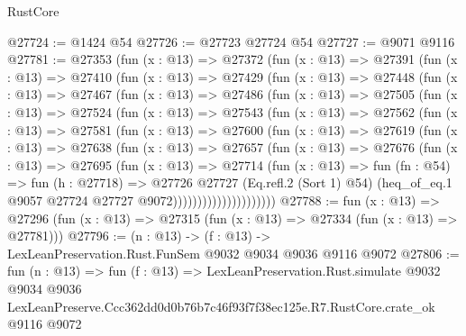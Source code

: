 \begin{lexlean}{RustCore}
\begin{coremodule}
@27724 := @1424 @54
@27726 := @27723 @27724 @54
@27727 := @9071 @9116
@27781 := @27353
    (fun (x : @13) =>
    @27372
      (fun (x : @13) =>
      @27391
        (fun (x : @13) =>
        @27410
          (fun (x : @13) =>
          @27429
            (fun (x : @13) =>
            @27448
              (fun (x : @13) =>
              @27467
                (fun (x : @13) =>
                @27486
                  (fun (x : @13) =>
                  @27505
                    (fun (x : @13) =>
                    @27524
                      (fun (x : @13) =>
                      @27543
                        (fun (x : @13) =>
                        @27562
                          (fun (x : @13) =>
                          @27581
                            (fun (x : @13) =>
                            @27600
                              (fun (x : @13) =>
                              @27619
                                (fun (x : @13) =>
                                @27638
                                  (fun (x : @13) =>
                                  @27657
                                    (fun (x : @13) =>
                                    @27676
                                      (fun (x : @13) =>
                                      @27695
                                        (fun (x : @13) =>
                                        @27714
                                          (fun (x : @13) =>
                                          fun (fn : @54) =>
                                          fun (h : @27718) =>
                                          @27726
                                            @27727
                                            (Eq.refl.{2} (Sort 1) @54)
                                            (heq_of_eq.{1}
                                              @9057
                                              @27724
                                              @27727
                                              @9072)))))))))))))))))))))
@27788 := fun (x : @13) =>
  @27296 (fun (x : @13) => @27315 (fun (x : @13) => @27334 (fun (x : @13) => @27781)))
@27796 := (n : @13) -> (f : @13) -> LexLeanPreservation.Rust.FunSem @9032 @9034 @9036 @9116 @9072
@27806 := fun (n : @13) =>
  fun (f : @13) =>
  LexLeanPreservation.Rust.simulate
    @9032
    @9034
    @9036
    LexLeanPreserve.Ccc362dd0d0b76b7c46f93f7f38ec125e.R7.RustCore.crate_ok
    @9116
    @9072
\end{coremodule}
\end{lexlean}
